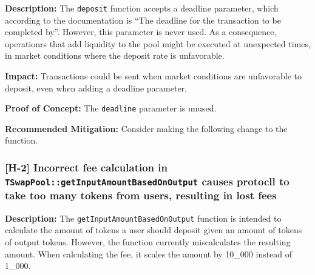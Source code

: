 \textbf{Description:} The \texttt{deposit} function accepts a deadline
parameter, which according to the documentation is ``The deadline for
the transaction to be completed by''. However, this parameter is never
used. As a consequence, operationrs that add liquidity to the pool might
be executed at unexpected times, in market conditions where the deposit
rate is unfavorable.

\textbf{Impact:} Transactions could be sent when market conditions are
unfavorable to deposit, even when adding a deadline parameter.

\textbf{Proof of Concept:} The \texttt{deadline} parameter is unused.

\textbf{Recommended Mitigation:} Consider making the following change to
the function.

\begin{Shaded}
\begin{Highlighting}[]
\NormalTok{    )}
\NormalTok{    \{}
\end{Highlighting}
\end{Shaded}

\subsubsection{\texorpdfstring{{[}H-2{]} Incorrect fee calculation in
\texttt{TSwapPool::getInputAmountBasedOnOutput} causes protocll to take
too many tokens from users, resulting in lost
fees}{{[}H-2{]} Incorrect fee calculation in TSwapPool::getInputAmountBasedOnOutput causes protocll to take too many tokens from users, resulting in lost fees}}\label{h-2-incorrect-fee-calculation-in-tswappoolgetinputamountbasedonoutput-causes-protocll-to-take-too-many-tokens-from-users-resulting-in-lost-fees}

\textbf{Description:} The \texttt{getInputAmountBasedOnOutput} function
is intended to calculate the amount of tokens a user should deposit
given an amount of tokens of output tokens. However, the function
currently miscalculates the resulting amount. When calculating the fee,
it scales the amount by 10\_000 instead of 1\_000.

